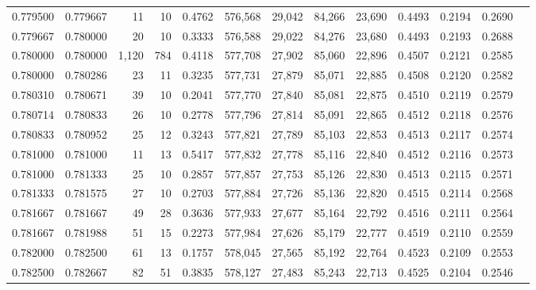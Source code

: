 \begin{tabular}{rrrrrrrrrrrrr}
0.779500 & 0.779667 &    11 &  10 &                                     0.4762 & 576,568 &  29,042 &  84,266 &  23,690 & 0.4493 & 0.2194 & 0.2690 \\
0.779667 & 0.780000 &    20 &  10 &                                     0.3333 & 576,588 &  29,022 &  84,276 &  23,680 & 0.4493 & 0.2193 & 0.2688 \\
0.780000 & 0.780000 & 1,120 & 784 &                                     0.4118 & 577,708 &  27,902 &  85,060 &  22,896 & 0.4507 & 0.2121 & 0.2585 \\
0.780000 & 0.780286 &    23 &  11 &                                     0.3235 & 577,731 &  27,879 &  85,071 &  22,885 & 0.4508 & 0.2120 & 0.2582 \\
0.780310 & 0.780671 &    39 &  10 &                                     0.2041 & 577,770 &  27,840 &  85,081 &  22,875 & 0.4510 & 0.2119 & 0.2579 \\
0.780714 & 0.780833 &    26 &  10 &                                     0.2778 & 577,796 &  27,814 &  85,091 &  22,865 & 0.4512 & 0.2118 & 0.2576 \\
0.780833 & 0.780952 &    25 &  12 &                                     0.3243 & 577,821 &  27,789 &  85,103 &  22,853 & 0.4513 & 0.2117 & 0.2574 \\
0.781000 & 0.781000 &    11 &  13 &                                     0.5417 & 577,832 &  27,778 &  85,116 &  22,840 & 0.4512 & 0.2116 & 0.2573 \\
0.781000 & 0.781333 &    25 &  10 &                                     0.2857 & 577,857 &  27,753 &  85,126 &  22,830 & 0.4513 & 0.2115 & 0.2571 \\
0.781333 & 0.781575 &    27 &  10 &                                     0.2703 & 577,884 &  27,726 &  85,136 &  22,820 & 0.4515 & 0.2114 & 0.2568 \\
0.781667 & 0.781667 &    49 &  28 &                                     0.3636 & 577,933 &  27,677 &  85,164 &  22,792 & 0.4516 & 0.2111 & 0.2564 \\
0.781667 & 0.781988 &    51 &  15 &                                     0.2273 & 577,984 &  27,626 &  85,179 &  22,777 & 0.4519 & 0.2110 & 0.2559 \\
0.782000 & 0.782500 &    61 &  13 &                                     0.1757 & 578,045 &  27,565 &  85,192 &  22,764 & 0.4523 & 0.2109 & 0.2553 \\
0.782500 & 0.782667 &    82 &  51 &                                     0.3835 & 578,127 &  27,483 &  85,243 &  22,713 & 0.4525 & 0.2104 & 0.2546 \\

\end{tabular}
